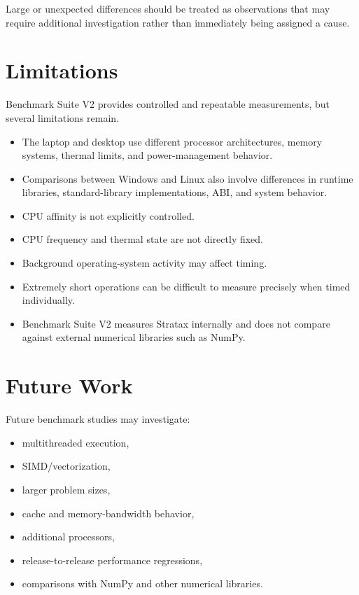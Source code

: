 \documentclass[11pt]{article}
\newcommand{\project}{Stratax}
\newcommand{\benchmarkversion}{V2}
\begin{document}
Large or unexpected differences should be treated as observations
that may require additional investigation rather than immediately
being assigned a cause.


\section{Limitations}

Benchmark Suite \benchmarkversion{} provides controlled and
repeatable measurements, but several limitations remain.

\begin{itemize}

    \item The laptop and desktop use different processor architectures,
          memory systems, thermal limits, and power-management behavior.

    \item Comparisons between Windows and Linux also involve differences
          in runtime libraries, standard-library implementations, ABI,
          and system behavior.

    \item CPU affinity is not explicitly controlled.

    \item CPU frequency and thermal state are not directly fixed.

    \item Background operating-system activity may affect timing.

    \item Extremely short operations can be difficult to measure
          precisely when timed individually.

    \item Benchmark Suite \benchmarkversion{} measures \project{}
          internally and does not compare against external numerical
          libraries such as NumPy.

\end{itemize}


\section{Future Work}

Future benchmark studies may investigate:

\begin{itemize}

    \item multithreaded execution,
    \item SIMD/vectorization,
    \item larger problem sizes,
    \item cache and memory-bandwidth behavior,
    \item additional processors,
    \item release-to-release performance regressions,
    \item comparisons with NumPy and other numerical libraries.
\end{itemize}
\end{document}
